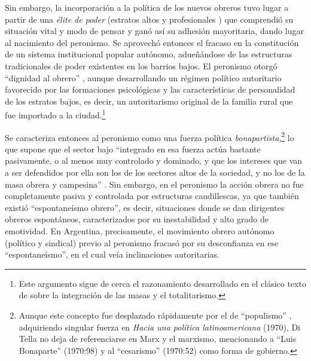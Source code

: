 Sin embargo, la incorporación a la política de los nuevos obreros tuvo lugar a partir de una \emph{élite de poder} (estratos altos y profesionales ) que comprendió su situación vital y modo de pensar y ganó así su adhesión mayoritaria, dando lugar al nacimiento del peronismo. Se aprovechó entonces el fracaso en la constitución de un sistema institucional popular autónomo, adueñándose de las estructuras tradicionales de poder existentes en los barrios bajos. El peronismo otorgó \enquote{dignidad al obrero} \parencite[36]{1649-DITELLA1964}, aunque desarrollando un régimen político autoritario favorecido por las formaciones psicológicas y las características de personalidad de los estratos bajos, es decir, un autoritarismo original de la familia rural que fue importado a la ciudad.\footnote{Este argumento sigue de cerca el razonamiento desarrollado en el clásico texto de \textcite{1683-GERMANI1956} sobre la integración de las masas y el totalitarismo.}

Se caracteriza entonces al peronismo como una fuerza política \emph{bonapartista},\footnote{Aunque este concepto fue desplazado rápidamente por el de \enquote{populismo} \parencite{1653-DITELLA1965}, adquiriendo singular fuerza en \emph{Hacia una política latinoamericana} (1970), Di Tella no deja de referenciarse en Marx y el marxismo, mencionando a \enquote{Luis Bonaparte} (1970:98) y al \enquote{cesarismo} (1970:52) como forma de gobierno.} lo que supone que el sector bajo \enquote{integrado en esa fuerza actúa bastante pasivamente, o al menos muy controlado y dominado, y que los intereses que van a ser defendidos por ella son los de los sectores altos de la sociedad, y no los de la masa obrera y campesina} \parencite[57]{1649-DITELLA1964}. Sin embargo, en el peronismo la acción obrera no fue completamente pasiva y controlada por estructuras caudillescas, ya que también existió \enquote{espontaneísmo obrero}, es decir, situaciones donde se dan dirigentes obreros espontáneos, caracterizados por su inestabilidad y alto grado de emotividad. En Argentina, precisamente, el movimiento obrero autónomo (político y sindical) previo al peronismo fracasó por su desconfianza en ese \enquote{espontaneísmo}, en el cual veía inclinaciones autoritarias.


